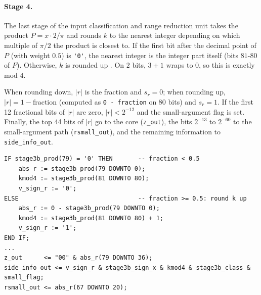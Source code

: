 \paragraph{Stage 4.}
The last stage of the input classification and range reduction unit takes the product
$P = x \cdot 2/\pi$ and rounds $k$ to the nearest integer depending on which multiple of
$\pi/2$ the product is closest to. If the first bit after the decimal point of $P$ (with
weight $0.5$) is \lstinline|'0'|, the nearest integer is the integer part itself
(bits $81$-$80$ of $P$). Otherwise, $k$ is rounded up .
On $2$ bits, $3+1$ wraps to $0$, so this is exactly mod $4$.

When rounding down, $|r|$ is the fraction and $s_r = 0$; when rounding up, $|r| = 1 - \text{fraction}$
(computed as \lstinline|0 - fraction| on 80 bits) and $s_r = 1$. If the first 12 fractional bits of
$|r|$ are zero, $|r| < 2^{-12}$ and the small-argument flag is set. Finally, the top 44 bits of
$|r|$ go to the core (\lstinline|z_out|), the bits $2^{-13}$ to $2^{-60}$ to the small-argument
path (\lstinline|rsmall_out|), and the remaining information to \lstinline|side_info_out|.

\begin{lstlisting}[caption = {Fourth stage -- rounding and outputs}, label = {lst:icrr-stage4}]
IF stage3b_prod(79) = '0' THEN       -- fraction < 0.5
    abs_r := stage3b_prod(79 DOWNTO 0);
    kmod4 := stage3b_prod(81 DOWNTO 80);
    v_sign_r := '0';
ELSE                                 -- fraction >= 0.5: round k up
    abs_r := 0 - stage3b_prod(79 DOWNTO 0);
    kmod4 := stage3b_prod(81 DOWNTO 80) + 1;
    v_sign_r := '1';
END IF;
...
z_out      <= "00" & abs_r(79 DOWNTO 36);
side_info_out <= v_sign_r & stage3b_sign_x & kmod4 & stage3b_class & small_flag;
rsmall_out <= abs_r(67 DOWNTO 20);
\end{lstlisting}